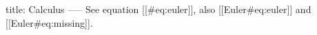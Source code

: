 title: Calculus
-----
See equation [[#eq:euler]], also [[Euler#eq:euler]] and [[Euler#eq:missing]].
